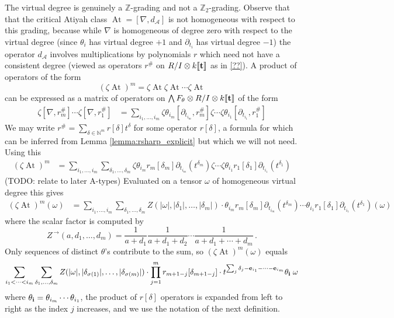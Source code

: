 \documentclass[english,letter paper,12pt,leqno]{article}
\theoremstyle{example}
\numberwithin{equation}{section}
\def\AA{\mathcal{A}}
\def\nZ{\mathds{Z}}
\DeclareMathOperator{\vAt}{At}
\begin{document}
The virtual degree is genuinely a $\nZ$-grading and not a $\nZ_2$-grading. Observe that that the critical Atiyah class $\vAt = [ \nabla, d_{\AA} ]$ is not homogeneous with respect to this grading, because while $\nabla$ is homogeneous of degree zero with respect to the virtual degree (since $\theta_i$ has virtual degree $+1$ and $\partial_{t_i}$ has virtual degree $-1$) the operator $d_{\AA}$ involves multiplications by polynomials $r$ which need not have a consistent degree (viewed as operators $r^{\#}$ on $R/I \otimes k\llbracket \bold{t} \rrbracket$ as in \eqref{??}). A product of operators of the form
\[
(\zeta \vAt)^m = \zeta \vAt \zeta \vAt \cdots \zeta \vAt
\]
can be expressed as a matrix of operators on $\bigwedge F_\theta \otimes R/I \otimes k \llbracket \bold{t} \rrbracket$ of the form
\begin{align*}
\zeta [ \nabla, r_m^{\#} ] \cdots \zeta [ \nabla, r_1^{\#} ] &= \sum_{i_1,\ldots,i_m} \zeta \theta_{i_m} [ \partial_{t_{i_m}}, r_m^{\#} ] \zeta \cdots \zeta \theta_{i_1} [ \partial_{t_{i_1}}, r_1^{\#} ]
\end{align*}
We may write $r^{\#} = \sum_{\delta \in \mathbb{N}^m} r[\delta] t^\delta$ for some operator $r[\delta]$, a formula for which can be inferred from Lemma \ref{lemma:rsharp_explicit} but which we will not need. Using this
\begin{align*}
(\zeta \vAt)^m &= \sum_{i_1,\ldots,i_m} \sum_{\delta_1, \ldots, \delta_m} \zeta \theta_{i_m} r_m[\delta_m] \partial_{t_{i_m}}(t^{\delta_m}) \zeta \cdots \zeta \theta_{i_1} r_1[\delta_1] \partial_{t_{i_1}}(t^{\delta_1})
\end{align*}
(TODO: relate to later A-types) Evaluated on a tensor $\omega$ of homogeneous virtual degree this gives
\begin{align*}
(\zeta \vAt)^m(\omega) &= \sum_{i_1, \ldots, i_m} \sum_{\delta_1,\ldots,\delta_m} Z(|\omega|,|\delta_1|,\ldots,|\delta_m|) \cdot \theta_{i_m} r_m[\delta_m] \partial_{t_{i_m}}(t^{\delta_m}) \cdots \theta_{i_1} r_1[\delta_1] \partial_{t_{i_1}}(t^{\delta_1})(\omega)
\end{align*}
where the scalar factor is computed by
\[
Z^{\,\rightarrow}(a,d_1,\ldots,d_m) = \frac{1}{a + d_1} \frac{1}{a + d_1 + d_{2}} \cdots \frac{1}{a + d_1 + \cdots + d_m}\,.
\]
Only sequences of distinct $\theta$'s contribute to the sum, so $(\zeta \vAt)^m(\omega)$ equals
\begin{align*}
\sum_{i_1 < \cdots < i_m} \sum_{\delta_1,\ldots,\delta_m} Z(|\omega|,|\delta_{\sigma(1)}|,\ldots,|\delta_{\sigma(m)}|) \cdot \prod_{j=1}^m r_{m+1-j}[\delta_{m+1-j}] \cdot t^{\sum_j \delta_j - \bold{e}_{i_1} - \cdots - \bold{e}_{i_m}} \theta_{\bold{i}}\; \omega
\end{align*}
where $\theta_{\bold{i}} = \theta_{i_m} \cdots \theta_{i_1}$, the product of $r[\delta]$ operators is expanded from left to right as the index $j$ increases, and we use the notation of the next definition.
\end{document}
